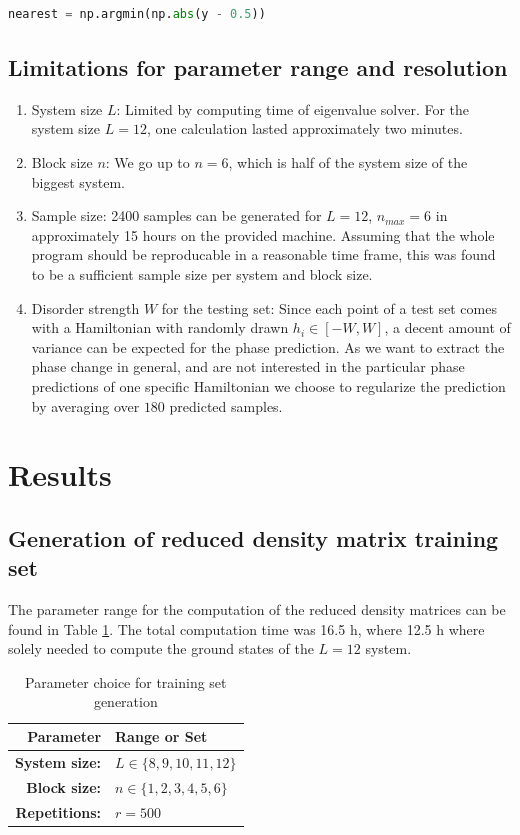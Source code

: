 \documentclass[reprint,amsmath,amssymb,aps,prb]{revtex4-2}
\begin{document}
\begin{lstlisting}[language=Python]
nearest = np.argmin(np.abs(y - 0.5))
\end{lstlisting}


\subsection{Limitations for parameter range and resolution}\label{sec:param}

\begin{enumerate}
	\item System size $L$: Limited by computing time of eigenvalue solver. For the system size $L=12$, one calculation lasted approximately two minutes.
	\item Block size $n$: We go up to $n=6$, which is half of the system size of the biggest system.
	\item Sample size: 2400 samples can be generated for $L=12$, $n_{max}=6$ in approximately 15 hours on the provided machine. Assuming that the whole program should be reproducable in a reasonable time frame, this was found to be a sufficient sample size per system and block size.
	\item Disorder strength $W$ for the testing set: Since each point of a test set comes with a Hamiltonian with randomly drawn $h_i\in\left[-W,W\right]$, a decent amount of variance can be expected for the phase prediction. As we want to extract the phase change in general, and are not interested in the particular phase predictions of one specific Hamiltonian we choose to regularize the prediction by averaging over $180$ predicted samples.
\end{enumerate}

\section{Results}

\subsection{Generation of reduced density matrix training set}

The parameter range for the computation of the reduced density matrices can be found in Table \ref{tab:par_train}. The total computation time was 16.5 h, where 12.5 h where solely needed to compute the ground states of the $L=12$ system.

\begin{table}[h!]
	\centering
	\begin{tabular}{rl}
		\hline
		Parameter & Range or Set \\
		\hline
		\hline 
	\textbf{System size:} & $L \in \{8, 9, 10, 11, 12\}$ \\ 
		\textbf{Block size:} & $n \in \{1, 2, 3, 4, 5, 6\}$ \\ 
		\textbf{Repetitions:} & $r=500$\\
		\hline
	\end{tabular} 
	\caption{Parameter choice for training set generation}\label{tab:par_train}
\end{table}
\end{document}
